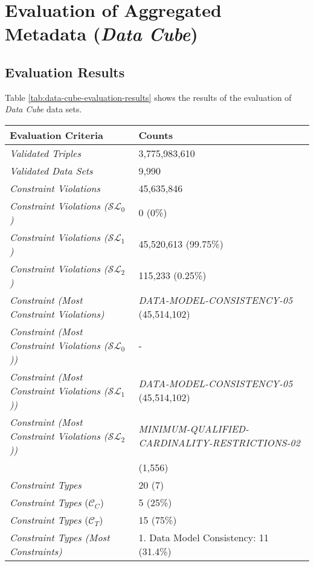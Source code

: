 \documentclass{llncs}
\begin{document}
\section{Evaluation of Aggregated Metadata (\emph{Data Cube})}

\subsection{Evaluation Results}

Table \ref{tab:data-cube-evaluation-results} shows the results of the evaluation of \emph{Data Cube} data sets.

\begin{table}[H]
  \scriptsize
	\centering
		\begin{tabular}{l|l}
      \textbf{Evaluation Criteria} & \textbf{Counts} \\		
      \hline
		\emph{Validated Triples} & 3,775,983,610 \\
		\emph{Validated Data Sets} & 9,990 \\
		\hline
		\emph{Constraint Violations} & 45,635,846 \\
		\emph{Constraint Violations ($\mathcal{SL}_{0}$)} & 0 (0\%) \\
		\emph{Constraint Violations ($\mathcal{SL}_{1}$)} & 45,520,613 (99.75\%) \\
    \emph{Constraint Violations ($\mathcal{SL}_{2}$)} & 115,233 (0.25\%) \\
		\hline
		\emph{Constraint (Most Constraint Violations)} & \emph{DATA-MODEL-CONSISTENCY-05} (45,514,102) \\
		\emph{Constraint (Most Constraint Violations ($\mathcal{SL}_{0}$))} & - \\
		\emph{Constraint (Most Constraint Violations ($\mathcal{SL}_{1}$))} & \emph{DATA-MODEL-CONSISTENCY-05} (45,514,102) \\
		\emph{Constraint (Most Constraint Violations ($\mathcal{SL}_{2}$))} & \emph{MINIMUM-QUALIFIED-CARDINALITY-RESTRICTIONS-02} \\
		                                                                    & (1,556) \\
		\hline
		\emph{Constraint Types} & 20 (7\textbar 13) \\
		\emph{Constraint Types} ($\mathcal{C}_{C}$) & 5 (25\%) \\
		\emph{Constraint Types} ($\mathcal{C}_{T}$) & 15 (75\%) \\
		\hline
		\emph{Constraint Types (Most Constraints)} & 1. Data Model Consistency: 11 (31.4\%\textbar10\textbar1) \\

\end{tabular}
\end{table}
\end{document}
